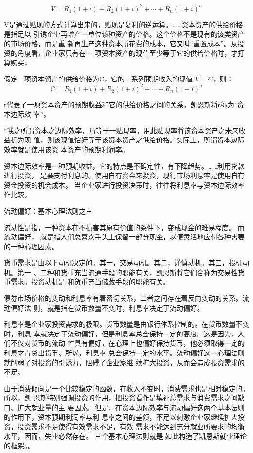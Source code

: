 \[ V = R_1(1+i) + R_2(1+i)^2 + \cdots + R_n(1+i)^n \]

V是通过贴现的方式计算出来的，贴现是复利的逆运算。……资本资产的供给价格是指足以
引诱企业再增产一单位该种资产的价格。这个价格不是现有的该类资产的市场价格，而是重
新再生产这种资本所花费的成本，它又叫“重置成本”。从投资的角度看，企业家只有在一
项资本资产的现值至少等于它的供给价格时，才打算购买，

假定一项资本资产的供给价格为C，它的一系列预期收入的现值 $V=C$，则：
\[ C = R_1(1+i) + R_2(1+i)^2 + \cdots + R_n(1+i)^n \]

r代表了一项资本资产的预期收益和它的供给价格之间的关系，凯恩斯将r称为“资本边际效
率”。

“我之所谓资本之边际效率，乃等于一贴现率，用此贴现率将该资本资产之未来收益折为现
值，则该现值恰好等于该资本资产之供给价格。”实际上，所谓资本边际效率就是使用该资
本资产的预期利润率。

资本边际效率是一种预期收益，它的特点是不确定性，有下降趋势。……利用贷款进行投资，
是要支付利息的。使用自有资金来投资，现行市场利息率是使用自有资金投资的机会成本。
当企业家进行投资决策时，往往将利息率与资本边际效率作比较。

流动偏好：基本心理法则之三

流动性是指，一种资本在不损害其原有价值的条件下，变成现金的难易程度。 而流动偏好，
就是指人们总喜欢手头上保留一部分现金，以便灵活地应付各种需要的一种心理因素。

货币需求是由以下动机决定的。其一，交易动机。其二，谨慎动机。其三，投机动机。第一
、二种和货币充当流通手段的职能有关，凯恩斯将它们合称为交易性货币需求。投资动机是
和货币充当储藏手段的职能有关。

债券市场价格的变动和利息率有着密切关系，二者之间存在着反向变动的关系。流动偏好法
则，就是指在货币数量不变时，利息率决定于流动偏好。

利息率是企业家投资需求的极限。货币数量是由银行体系控制的。在货币数量不变时，利息
率就决定于流动偏好，但是利息率总会保持一定的高度。这是因为，人们不仅对货币的流动
性具有偏好，在心理上也偏好保持货币，他必须取得一定的利息才肯贷出货币。所以，利息率
总会保持一定的水平。流动偏好这一心理法则就削弱了对投资的引诱力，阻碍了企业家继
续扩大投资，从而会造成投资需求的不足。

由于消费倾向是一个比较稳定的函数，在收入不变时，消费需求也是相对稳定的。所以，凯
恩斯特别强调投资的作用，把投资看作是填补总需求与消费需求之间缺口、扩大就业量的主
要因素。但是，在资本边际效率与流动偏好这两个基本法则的作用下，资本预期利润率与利
息率之间的差额，不足以刺激企业家继续扩大投资，投资需求不足使得有效需求不足，有效
需求不能达到充分就业所要求的均衡水平，因而，失业必然存在。 三个基本心理法则就是
如此构造了凯恩斯就业理论的框架。。

